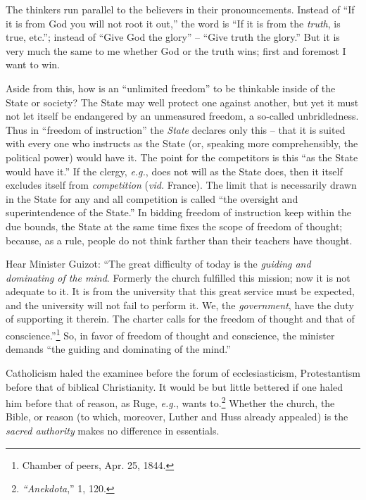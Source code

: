 The thinkers run parallel to the believers in their pronouncements. Instead of 
``If it is from God you will not root it out,'' the word is ``If it is from 
the \textit{truth}, is true, etc.''; instead of ``Give God the glory'' -- 
``Give truth the glory.'' But it is very much the same to me whether God or 
the truth wins; first and foremost I want to win.

Aside from this, how is an ``unlimited freedom'' to be thinkable inside of 
the State or society? The State may well protect one against another, but yet 
it must not let itself be endangered by an unmeasured freedom, a so-called 
unbridledness. Thus in ``freedom of instruction'' the \textit{State} 
declares only this -- that it is suited with every one who instructs as the 
State (or, speaking more comprehensibly, the political power) would have it. 
The point for the competitors is this ``as the State would have it.'' If the 
clergy, \textit{e.g.}, does not will as the State does, then it itself 
excludes itself from \textit{competition} (\textit{vid.} France). The limit 
that is necessarily drawn in the State for any and all competition is called 
``the oversight and superintendence of the State.'' In bidding freedom of 
instruction keep within the due bounds, the State at the same time fixes the 
scope of freedom of thought; because, as a rule, people do not think farther 
than their teachers have thought.

Hear Minister Guizot: ``The great difficulty of today is the \textit{guiding 
and dominating of the mind}. Formerly the church fulfilled this mission; now 
it is not adequate to it. It is from the university that this great service 
must be expected, and the university will not fail to perform it. We, the 
\textit{government}, have the duty of supporting it therein. The charter calls 
for the freedom of thought and that of conscience.''\footnote{Chamber of 
peers, Apr. 25, 1844.} So, in favor of freedom of thought and conscience, the 
minister demands ``the guiding and dominating of the mind.''

Catholicism haled the examinee before the forum of ecclesiasticism, 
Protestantism before that of biblical Christianity. It would be but little 
bettered if one haled him before that of reason, as Ruge, \textit{e.g.}, 
wants to.\footnote{\textit{``Anekdota},'' 1, 120.} Whether the church, the 
Bible, or reason (to which, moreover, Luther and Huss already appealed) is the 
\textit{sacred authority} makes no difference in essentials.

